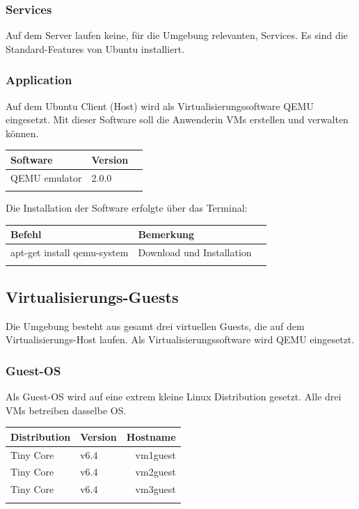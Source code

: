 \documentclass[a4,12pt]{scrartcl}
\begin{document}
\subsubsection{Services}
Auf dem Server laufen keine, für die Umgebung relevanten, Services. Es sind die Standard-Features von Ubuntu installiert.  

\subsubsection{Application}
Auf dem Ubuntu Client (Host) wird als Virtualisierungssoftware QEMU eingesetzt. Mit dieser Software soll die Anwenderin VMs erstellen und verwalten können. 
\begin{center}
    \begin{tabular}{@{} l l r@{}}\toprule    
    {Software} & {Version}\\ \midrule
    QEMU emulator & 2.0.0\\ \addlinespace
    \bottomrule
    \end{tabular}
\end{center}
Die Installation der Software erfolgte über das Terminal: 
\begin{center}
    \begin{tabular}{@{} l l r@{}}\toprule    
    {Befehl} & {Bemerkung}\\ \midrule
    apt-get install qemu-system & Download und Installation\\
     \addlinespace
    \bottomrule
    \end{tabular}
\end{center}

\subsection{Virtualisierungs-Guests}
Die Umgebung besteht aus gesamt drei virtuellen Guests, die auf dem Virtualisierungs-Host laufen. Als Virtualisierungssoftware wird QEMU eingesetzt. 

\subsubsection{Guest-OS}
Als Guest-OS wird auf eine extrem kleine Linux Distribution gesetzt. Alle drei VMs betreiben dasselbe OS. 
\begin{center}
    \begin{tabular}{@{} l l r@{}}\toprule    
    {Distribution} & {Version} & {Hostname}\\ \toprule
    Tiny Core & v6.4 & vm1guest\\ 
    Tiny Core & v6.4 & vm2guest\\
    Tiny Core & v6.4 & vm3guest\\ \addlinespace
    \bottomrule
    \end{tabular}
\end{center}
\end{document}
